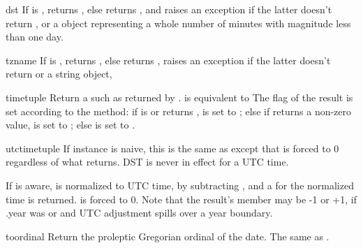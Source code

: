 \begin{methoddesc}{dst}{}
  If  is , returns , else
  returns , and
  raises an exception if the latter doesn't return , or
  a  object representing a whole number of minutes
  with magnitude less than one day.
\end{methoddesc}

\begin{methoddesc}{tzname}{}
  If  is , returns , else
  returns ,
  raises an exception if the latter doesn't return  or
  a string object,
\end{methoddesc}

\begin{methoddesc}{timetuple}{}
  Return a  such as returned by
  .
   is equivalent to
  The  flag of the result is set according to
  the  method:  if  is  or
   returns ,
   is set to  ; else if  returns
  a non-zero value,  is set to ;
  else  is set to .
\end{methoddesc}

\begin{methoddesc}{utctimetuple}{}
  If  instance  is naive, this is the same as
   except that  is forced to 0
  regardless of what  returns.  DST is never in effect
  for a UTC time.

  If  is aware,  is normalized to UTC time, by subtracting
  , and a  for the
  normalized time is returned.   is forced to 0.
  Note that the result's  member may be
  -1 or +1, if .year was
   or  and UTC adjustment spills over a
  year boundary.
\end{methoddesc}

\begin{methoddesc}{toordinal}{}
  Return the proleptic Gregorian ordinal of the date.  The same as
  .
\end{methoddesc}

